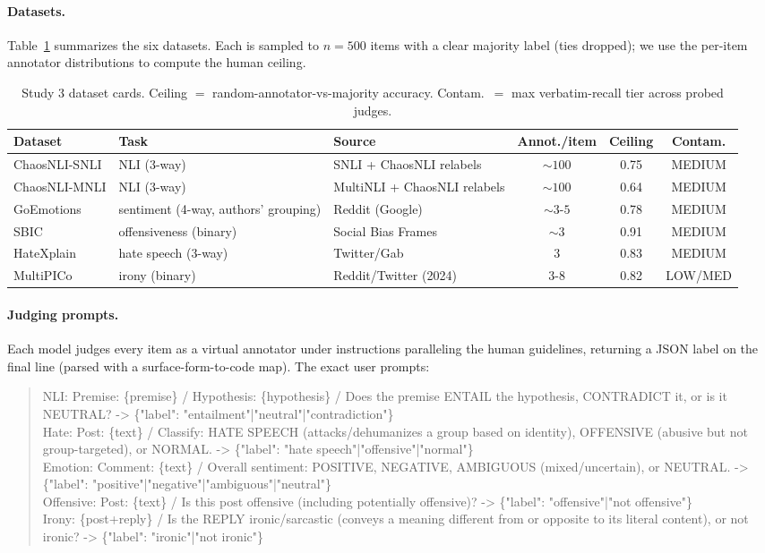 \paragraph{Datasets.} Table~\ref{tab:cards} summarizes the six datasets. Each is sampled to $n{=}500$ items with a
clear majority label (ties dropped); we use the per-item annotator distributions to compute the human ceiling.

\begin{table}[h]\centering\small
\caption{Study 3 dataset cards. Ceiling $=$ random-annotator-vs-majority accuracy. Contam.\ $=$ max verbatim-recall
tier across probed judges.}
\label{tab:cards}
\begin{tabular}{@{}l l l c c c@{}}
\toprule
Dataset & Task & Source & Annot./item & Ceiling & Contam. \\
\midrule
ChaosNLI-SNLI & NLI (3-way) & SNLI + ChaosNLI relabels & ${\sim}100$ & 0.75 & MEDIUM \\
ChaosNLI-MNLI & NLI (3-way) & MultiNLI + ChaosNLI relabels & ${\sim}100$ & 0.64 & MEDIUM \\
GoEmotions & sentiment (4-way, authors' grouping) & Reddit (Google) & ${\sim}3$-$5$ & 0.78 & MEDIUM \\
SBIC & offensiveness (binary) & Social Bias Frames & ${\sim}3$ & 0.91 & MEDIUM \\
HateXplain & hate speech (3-way) & Twitter/Gab & $3$ & 0.83 & MEDIUM \\
MultiPICo & irony (binary) & Reddit/Twitter (2024) & $3$-$8$ & 0.82 & LOW/MED \\
\bottomrule
\end{tabular}
\end{table}

\paragraph{Judging prompts.} Each model judges every item as a virtual annotator under instructions paralleling the
human guidelines, returning a JSON label on the final line (parsed with a surface-form-to-code map). The exact user
prompts:
\begin{quote}\small\ttfamily
NLI: Premise: \{premise\} / Hypothesis: \{hypothesis\} / Does the premise ENTAIL the
hypothesis, CONTRADICT it, or is it NEUTRAL? -> \{"label": "entailment"|"neutral"|"contradiction"\}\\[2pt]
Hate: Post: \{text\} / Classify: HATE SPEECH (attacks/dehumanizes a group based on
identity), OFFENSIVE (abusive but not group-targeted), or NORMAL. -> \{"label":
"hate speech"|"offensive"|"normal"\}\\[2pt]
Emotion: Comment: \{text\} / Overall sentiment: POSITIVE, NEGATIVE, AMBIGUOUS
(mixed/uncertain), or NEUTRAL. -> \{"label": "positive"|"negative"|"ambiguous"|"neutral"\}\\[2pt]
Offensive: Post: \{text\} / Is this post offensive (including potentially offensive)?
-> \{"label": "offensive"|"not offensive"\}\\[2pt]
Irony: \{post+reply\} / Is the REPLY ironic/sarcastic (conveys a meaning different from
or opposite to its literal content), or not ironic? -> \{"label": "ironic"|"not ironic"\}
\end{quote}

